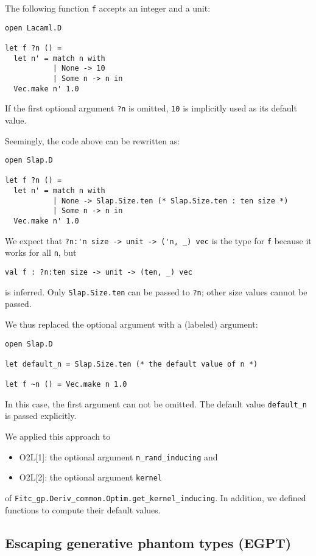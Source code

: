 \documentclass[10pt,a4paper]{article}
\begin{document}
The following function \lstinline|f| accepts an integer and a unit:
\begin{lstlisting}
open Lacaml.D

let f ?n () =
  let n' = match n with
           | None -> 10
           | Some n -> n in
  Vec.make n' 1.0
\end{lstlisting}
If the first optional argument \lstinline|?n| is omitted,
\lstinline|10| is implicitly used as its default value.

Seemingly, the code above can be rewritten as:
\begin{lstlisting}
open Slap.D

let f ?n () =
  let n' = match n with
           | None -> Slap.Size.ten (* Slap.Size.ten : ten size *)
           | Some n -> n in
  Vec.make n' 1.0
\end{lstlisting}
We expect that \lstinline|?n:'n size -> unit -> ('n, _) vec| is the type for \lstinline|f|
because it works for all \lstinline|n|, but
\begin{lstlisting}
val f : ?n:ten size -> unit -> (ten, _) vec
\end{lstlisting}
is inferred. Only \lstinline|Slap.Size.ten| can be passed to
\lstinline|?n|; other size values cannot be passed.

We thus replaced the optional argument with a (labeled) argument:
\begin{lstlisting}
open Slap.D

let default_n = Slap.Size.ten (* the default value of n *)

let f ~n () = Vec.make n 1.0
\end{lstlisting}
In this case, the first argument can not be omitted.
The default value \lstinline|default_n| is passed explicitly.

We applied this approach to
\begin{itemize}
\item O2L[1]: the optional argument \lstinline|n_rand_inducing| and
\item O2L[2]: the optional argument \lstinline|kernel|
\end{itemize}
of \lstinline|Fitc_gp.Deriv_common.Optim.get_kernel_inducing|.
In addition, we defined functions to compute their default values.

\subsection{Escaping generative phantom types (EGPT)}
\label{sec:EGPT}
\end{document}
